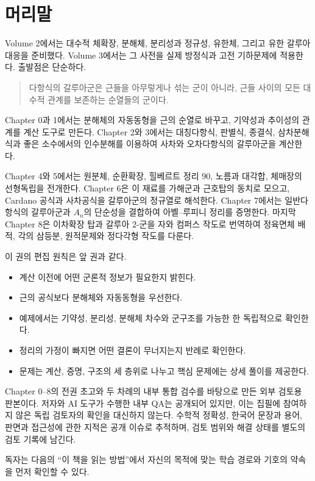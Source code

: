 \chapter*{머리말}

Volume 2에서는 대수적 체확장, 분해체, 분리성과 정규성, 유한체, 그리고 유한 갈루아 대응을 준비했다. Volume 3에서는 그 사전을 실제 방정식과 고전 기하문제에 적용한다. 출발점은 단순하다.

\begin{quote}
다항식의 갈루아군은 근들을 아무렇게나 섞는 군이 아니라, 근들 사이의 모든 대수적 관계를 보존하는 순열들의 군이다.
\end{quote}

Chapter 0과 1에서는 분해체의 자동동형을 근의 순열로 바꾸고, 기약성과 추이성의 관계를 계산 도구로 만든다. Chapter 2와 3에서는 대칭다항식, 판별식, 종결식, 삼차분해식과 좋은 소수에서의 인수분해를 이용하여 사차와 오차다항식의 갈루아군을 계산한다.

Chapter 4와 5에서는 원분체, 순환확장, 힐베르트 정리 90, 노름과 대각합, 체매장의 선형독립을 전개한다. Chapter 6은 이 재료를 가해군과 근호탑의 동치로 모으고, Cardano 공식과 사차공식을 갈루아군의 정규열로 해석한다. Chapter 7에서는 일반다항식의 갈루아군과 $A_n$의 단순성을 결합하여 아벨--루피니 정리를 증명한다. 마지막 Chapter 8은 이차확장 탑과 갈루아 $2$-군을 자와 컴퍼스 작도로 번역하여 정육면체 배적, 각의 삼등분, 원적문제와 정다각형 작도를 다룬다.

이 권의 편집 원칙은 앞 권과 같다.

\begin{itemize}
  \item 계산 이전에 어떤 군론적 정보가 필요한지 밝힌다.
  \item 근의 공식보다 분해체와 자동동형을 우선한다.
  \item 예제에서는 기약성, 분리성, 분해체 차수와 군구조를 가능한 한 독립적으로 확인한다.
  \item 정리의 가정이 빠지면 어떤 결론이 무너지는지 반례로 확인한다.
  \item 문제는 계산, 증명, 구조의 세 층위로 나누고 핵심 문제에는 상세 풀이를 제공한다.
\end{itemize}

 Chapter 0--8의 전권 초고와 두 차례의 내부 통합 검수를 바탕으로 만든 외부 검토용 판본이다. 저자와 AI 도구가 수행한 내부 QA는 공개되어 있지만, 이는 집필에 참여하지 않은 독립 검토자의 확인을 대신하지 않는다. 수학적 정확성, 한국어 문장과 용어, 판면과 접근성에 관한 지적은 공개 이슈로 추적하며, 검토 범위와 해결 상태를 별도의 검토 기록에 남긴다.

독자는 다음의 ``이 책을 읽는 방법''에서 자신의 목적에 맞는 학습 경로와 기호의 약속을 먼저 확인할 수 있다.
